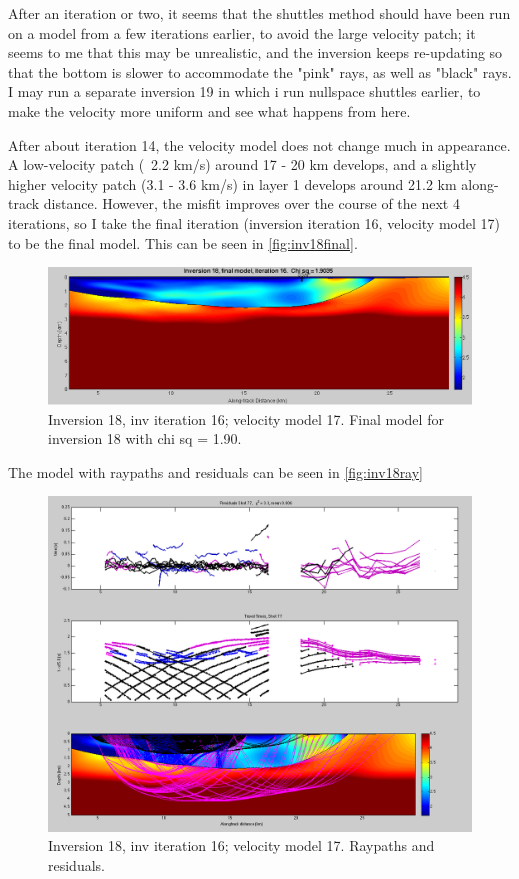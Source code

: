 \documentclass[fontsize=11pt, %
                             paper=a4, %
                             twoside, %
                             captions=tableheading,
                             index=totoc,
                             hyperref]{labbook}
\begin{document}
\begin{addmargin}[4cm]{0cm}
 After an iteration or two, it seems that the shuttles method should have been run on a model from a few iterations earlier, to avoid the large velocity patch; it seems to me that this may be unrealistic, and the inversion keeps re-updating so that the bottom is slower to accommodate the "pink" rays, as well as "black" rays.  I may run a separate inversion 19 in which i run nullspace shuttles earlier, to make the velocity more uniform and see what happens from here. 
 
 After about iteration 14, the velocity model does not change much in appearance.  A low-velocity patch (~2.2 km/s) around 17 - 20 km develops, and a slightly higher velocity patch (3.1 - 3.6 km/s) in layer 1 develops around 21.2 km along-track distance.  However, the misfit improves over the course of the next 4 iterations, so I take the final iteration (inversion iteration 16, velocity model 17) to be the final model.  This can be seen in \autoref{fig:inv18final}.  
 
 
 \begin{figure}[h!]
\raggedleft
\includegraphics[scale=0.4,keepaspectratio=true]{figs/inv18final.png}
\caption{Inversion 18, inv iteration 16; velocity model 17.  Final model for inversion 18 with chi sq = 1.90.}
\label{fig:inv18final}
\end{figure} 
 
 The model with raypaths and residuals can be seen in \autoref{fig:inv18ray}

\begin{figure}[h!]
\raggedleft
\includegraphics[scale=0.4,keepaspectratio=true]{figs/inv18finalRay.png}
\caption{Inversion 18, inv iteration 16; velocity model 17.  Raypaths and residuals.}
\label{fig:inv18ray}
\end{figure} 



\end{addmargin}
\end{document}
